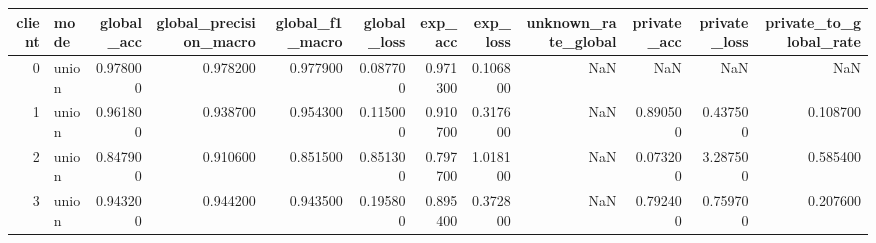 \begin{tabular}{rlrrrrrrrrrr}
\toprule
client & mode & global_acc & global_precision_macro & global_f1_macro & global_loss & exp_acc & exp_loss & unknown_rate_global & private_acc & private_loss & private_to_global_rate \\
\midrule
0 & union & 0.978000 & 0.978200 & 0.977900 & 0.087700 & 0.971300 & 0.106800 & NaN & NaN & NaN & NaN \\
1 & union & 0.961800 & 0.938700 & 0.954300 & 0.115000 & 0.910700 & 0.317600 & NaN & 0.890500 & 0.437500 & 0.108700 \\
2 & union & 0.847900 & 0.910600 & 0.851500 & 0.851300 & 0.797700 & 1.018100 & NaN & 0.073200 & 3.287500 & 0.585400 \\
3 & union & 0.943200 & 0.944200 & 0.943500 & 0.195800 & 0.895400 & 0.372800 & NaN & 0.792400 & 0.759700 & 0.207600 \\
\bottomrule
\end{tabular}
